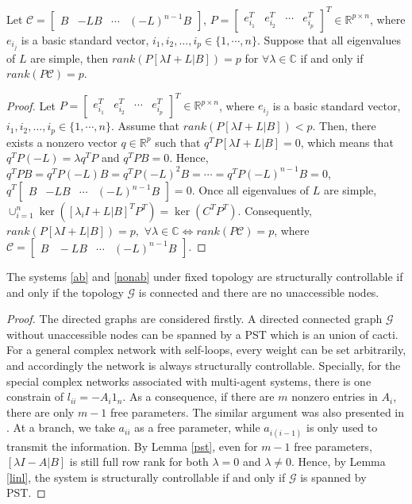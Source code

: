 \documentclass[a4paper,11pt]{article}
\begin{document}
{\begin{lemma}\label{iff}
Let $\mathcal{C}=[\begin{array}{*{6}{c}}B&-LB&\cdots&(-L)^{n-1}B\end{array}]$, $P=[\begin{array}{*{5}{c}}e_{i_1}^T&e_{i_2}^T&\cdots&e_{i_p}^T\end{array}]^T\in\mathbb{R}^{p\times n}$, where $e_{i_j}$ is a basic standard vector, $i_1,i_2,\ldots,i_p\in\{1,\cdots,n\}.$ Suppose that all eigenvalues of $L$ are simple, then $rank(P[\lambda I+L|B])=p$ for $\forall \lambda \in\mathbb{C}$ if and only if $rank(P\mathcal{C})=p$.
\end{lemma}\begin{proof}
Let $P=[\begin{array}{*{5}{c}}e_{i_1}^T&e_{i_2}^T&\cdots&e_{i_p}^T\end{array}]^T\in\mathbb{R}^{p\times n}$, where $e_{i_j}$ is a basic standard vector, $i_1,i_2,\ldots,i_p\in\{1,\cdots,n\}.$ Assume that $rank(P[\lambda I+L|B])<p$. Then, there exists a nonzero vector $q\in\mathbb{R}^{p}$ such that $q^TP[\lambda I+L|B]=0$, which means that $q^TP(-L)=\lambda q^TP$ and $q^TPB=0$. Hence, $q^TPB=q^TP(-L)B=q^TP(-L)^2B=\cdots=q^TP(-L)^{n-1}B=0$, $q^T[\begin{array}{*{6}{c}}B&-LB&\cdots&(-L)^{n-1}B\end{array}]=0.$ Once all eigenvalues of $L$ are simple, $\cup_{i=1}^n\ker([\lambda_i I+L|B]^TP^T)=\ker(C^TP^T)$. Consequently, $rank(P[\lambda I+L|B])=p,$ $\forall \lambda \in\mathbb{C}\Longleftrightarrow rank(P\mathcal{C})=p$, where $\mathcal{C}=[\begin{array}{*{6}{c}}\!\!B\!&\!-LB\!&\!\cdots\!&\!(-L)^{n-1}B\!\!\end{array}]$.
\end{proof}
\begin{theorem}\label{t2}
The systems \eqref{ab} and \eqref{nonab} under fixed topology are structurally controllable if and only if the topology $\mathcal{G}$ is connected and there are no unaccessible nodes.
\end{theorem}
\begin{proof}
The directed graphs are considered firstly. A directed connected graph $\mathcal{G}$ without unaccessible nodes can be spanned by a PST which is an union of cacti. For a general complex network with self-loops, every weight can be set arbitrarily, and accordingly the network is always structurally controllable. Specially, for the special complex networks associated with multi-agent systems, there is one constrain of $l_{ii}=-A_i1_n$.
 As a consequence, if there are $m$ nonzero entries in $A_i$, there are only $m-1$ free parameters. The similar  argument was also presented in \cite{para}. At a branch, we take $a_{ii}$ as a free parameter, while $a_{i(i-1)}$ is only used to transmit the information. By Lemma \ref{pst}, even for $m-1$ free parameters, $[\lambda I-A|B]$ is still full row rank for both $\lambda=0$ and $\lambda\ne0$. Hence, by Lemma \ref{linl}, the system is structurally controllable if and only if $\mathcal{G}$ is spanned by PST.


\end{proof}}
\end{document}
